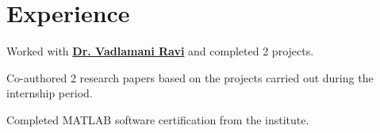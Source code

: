 \documentclass[]{deedy-resume-openfont}
\begin{document}
\begin{minipage}[t]{0.66\textwidth} 


\section{Experience}
\sectionsep

\vspace{\topsep} %
\begin{tightemize}
\item Worked with \textbf{\href{http://www.idrbt.ac.in/vravi.html}{Dr. Vadlamani Ravi}} and completed 2 projects.
\item Co-authored 2 research papers based on the projects carried out during the internship period.
\item Completed MATLAB software certification from the institute.
\end{tightemize}
\sectionsep




\end{minipage}
\end{document}
